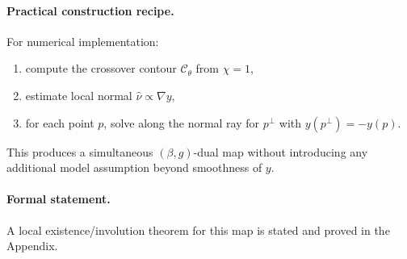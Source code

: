 \paragraph{Practical construction recipe.}
For numerical implementation:
\begin{enumerate}
  \item compute the crossover contour \(\mathcal{C}_\theta\) from \(\chi=1\),
  \item estimate local normal \(\hat\nu\propto\nabla y\),
  \item for each point \(p\), solve along the normal ray for \(p^\perp\) with \(y(p^\perp)=-y(p)\).
\end{enumerate}
This produces a simultaneous \((\beta,g)\)-dual map without introducing any additional model
assumption beyond smoothness of \(y\).

\paragraph{Formal statement.}
A local existence/involution theorem for this map is stated and proved in
the Appendix.
